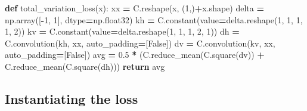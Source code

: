 \documentclass[]{book}
\newenvironment{Shaded}{\begin{snugshade}}{\end{snugshade}}
\newcommand{\KeywordTok}[1]{\textcolor[rgb]{0.13,0.29,0.53}{\textbf{#1}}}
\newcommand{\DecValTok}[1]{\textcolor[rgb]{0.00,0.00,0.81}{#1}}
\newcommand{\FloatTok}[1]{\textcolor[rgb]{0.00,0.00,0.81}{#1}}
\newcommand{\VariableTok}[1]{\textcolor[rgb]{0.00,0.00,0.00}{#1}}
\newcommand{\ControlFlowTok}[1]{\textcolor[rgb]{0.13,0.29,0.53}{\textbf{#1}}}
\newcommand{\OperatorTok}[1]{\textcolor[rgb]{0.81,0.36,0.00}{\textbf{#1}}}
\newcommand{\NormalTok}[1]{#1}
\theoremstyle{definition}
\theoremstyle{definition}
\theoremstyle{definition}
\theoremstyle{remark}
\begin{document}
\begin{Shaded}
\begin{Highlighting}[]
\KeywordTok{def}\NormalTok{ total_variation_loss(x):}
\NormalTok{    xx }\OperatorTok{=}\NormalTok{ C.reshape(x, (}\DecValTok{1}\NormalTok{,)}\OperatorTok{+}\NormalTok{x.shape)}
\NormalTok{    delta }\OperatorTok{=}\NormalTok{ np.array([}\OperatorTok{-}\DecValTok{1}\NormalTok{, }\DecValTok{1}\NormalTok{], dtype}\OperatorTok{=}\NormalTok{np.float32)}
\NormalTok{    kh }\OperatorTok{=}\NormalTok{ C.constant(value}\OperatorTok{=}\NormalTok{delta.reshape(}\DecValTok{1}\NormalTok{, }\DecValTok{1}\NormalTok{, }\DecValTok{1}\NormalTok{, }\DecValTok{1}\NormalTok{, }\DecValTok{2}\NormalTok{))}
\NormalTok{    kv }\OperatorTok{=}\NormalTok{ C.constant(value}\OperatorTok{=}\NormalTok{delta.reshape(}\DecValTok{1}\NormalTok{, }\DecValTok{1}\NormalTok{, }\DecValTok{1}\NormalTok{, }\DecValTok{2}\NormalTok{, }\DecValTok{1}\NormalTok{))}
\NormalTok{    dh }\OperatorTok{=}\NormalTok{ C.convolution(kh, xx, auto_padding}\OperatorTok{=}\NormalTok{[}\VariableTok{False}\NormalTok{])}
\NormalTok{    dv }\OperatorTok{=}\NormalTok{ C.convolution(kv, xx, auto_padding}\OperatorTok{=}\NormalTok{[}\VariableTok{False}\NormalTok{])}
\NormalTok{    avg }\OperatorTok{=} \FloatTok{0.5} \OperatorTok{*}\NormalTok{ (C.reduce_mean(C.square(dv)) }\OperatorTok{+}\NormalTok{ C.reduce_mean(C.square(dh)))}
    \ControlFlowTok{return}\NormalTok{ avg}
\end{Highlighting}
\end{Shaded}

\subsection{Instantiating the loss}\label{instantiating-the-loss}
\end{document}

